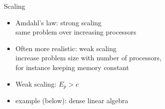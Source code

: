 \documentclass[11pt]{beamer}
\begin{document}
\begin{frame}{Scaling}
  \begin{itemize}
  \item Amdahl's law: strong scaling\\
    same problem over increasing processors
  \item Often more realistic: weak scaling\\
    increase problem size with number of processors,\\
    for instance keeping memory constant
  \item Weak scaling: $E_p>c$
  \item example (below): dense linear algebra
  \end{itemize}
\end{frame}





\end{document}
